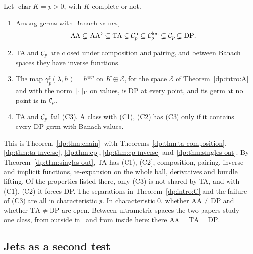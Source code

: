 \begin{introtheorem}\label{dp:intro:C}
Let $\operatorname{char}K=p>0$, with $K$ complete or not.
\begin{enumerate}
\item Among germs with Banach values,
\[
 \mathrm{AA}\subsetneq\mathrm{AA}^\circ\subseteq\mathrm{TA}\subseteq\mathcal{C}_p^{\rm u}\subseteq\mathcal{C}_p^{\rm loc}\subsetneq\mathcal{C}_p\subsetneq\mathrm{DP}.
\]
\item TA and $\mathcal{C}_p$ are closed under composition and pairing, and between Banach spaces they have inverse functions.
\item The map $\gamma^\sharp_p(\lambda,h)=h^{\otimes p}$ on $K\oplus\mathcal E$, for the space $\mathcal E$ of Theorem~\ref{dp:intro:A} and with the norm $\lVert \cdot\rVert_\Gamma$ on values, is DP at every point, and its germ at no point is in $\mathcal{C}_p$.
\item TA and $\mathcal{C}_p$ fail \textup{(C3)}. A class with \textup{(C1), (C2)} has \textup{(C3)} only if it contains every DP germ with Banach values.
\end{enumerate}
\end{introtheorem}

This is Theorem~\ref{dp:thm:chain}, with Theorems~\ref{dp:thm:ta-composition}, \ref{dp:thm:ta-inverse}, \ref{dp:thm:cp}, \ref{dp:thm:cp-inverse} and~\ref{dp:thm:singles-out}. By Theorem~\ref{dp:thm:singles-out}, TA has (C1), (C2), composition, pairing, inverse and implicit functions, re-expansion on the whole ball, derivatives and bundle lifting. Of the properties listed there, only (C3) is not shared by TA, and with (C1), (C2) it forces DP. The separations in Theorem~\ref{dp:intro:C} and the failure of (C3) are all in characteristic $p$. In characteristic $0$, whether $\mathrm{AA}\ne\mathrm{DP}$ and whether $\mathrm{TA}\ne\mathrm{DP}$ are open. Between ultrametric spaces the two papers study one class, from outside in~\cite{I} and from inside here: there $\mathrm{AA}=\mathrm{TA}=\mathrm{DP}$.

\subsection*{Jets as a second test}

